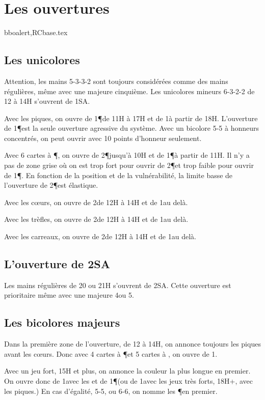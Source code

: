 \chapter{Les ouvertures}
bboalert,RCbase.tex

\begin{multicols}{2}


\section*{Les  unicolores}


Attention, les mains 5-3-3-2 sont toujours considérées comme des mains régulières, même avec une majeure cinquième.
Les unicolores mineurs 6-3-2-2 de 12 à 14H s'ouvrent de 1SA.

Avec les piques, on ouvre de 1\P de 11H à 17H et de 1\K à partir de 18H. L'ouverture de 1\P est la seule ouverture agressive du système.
Avec un bicolore 5-5 à honneurs concentrés, on peut ouvrir avec 10 points d'honneur seulement.

Avec 6 cartes à \P, on ouvre de 2\P jusqu'à 10H et de 1\P à partir de  11H. Il n'y a pas de zone grise où on est trop fort pour ouvrir de 2\P et trop faible pour ouvrir de 1\P. En fonction de la position et de la vulnérabilité, la limite basse de l'ouverture de 2\P est élastique.

Avec les cœurs, on ouvre de 2\C de 12H à 14H et de 1\T au delà.

Avec les trèfles, on ouvre de 2\T de 12H à 14H et de 1\C au delà.


Avec les carreaux, on ouvre de 2\K de 12H à 14H et de 1\C au delà.

\section*{L'ouverture de 2SA}

Les mains régulières de 20 ou 21H s'ouvrent de 2SA. Cette ouverture est prioritaire même avec une majeure 4\ieme ou 5\ieme.

\section*{Les bicolores majeurs}

Dans la première zone de l'ouverture, de 12 à 14H, on annonce toujours les piques avant les cœurs. Donc avec 4 cartes à \P et 5 cartes à \C, on ouvre de 1\K.

Avec un jeu fort, 15H et plus, on annonce la couleur la plus longue en premier. On ouvre donc de 1\T avec les \C et de 1\P (ou de 1\K avec les jeux très forts, 18H+, avec les piques.)
En cas d'égalité, 5-5, ou 6-6, on nomme les \P en premier.


\end{multicols}
